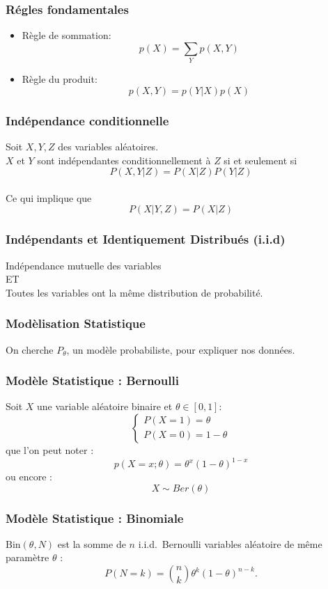 \begin{frame}
  \frametitle{Régles fondamentales}
  \begin{itemize}
  \item Règle de sommation: $$p(X)=\sum_{Y}p(X,Y)$$
  \item Règle du produit: $$p(X,Y)=p(Y|X)p(X)$$
  \end{itemize}
\end{frame}

\begin{frame}
  \frametitle{Indépendance conditionnelle}
    Soit $X,Y,Z$ des variables aléatoires. \\
    $X$ et $Y$ sont indépendantes conditionnellement à $Z$ si et seulement si $$P (X,Y | Z)=P(X|Z)P(Y|Z)$$ \\
    Ce qui implique que $$P(X|Y,Z)=P (X|Z)$$
\end{frame}

\begin{frame}
  \frametitle{Indépendants et Identiquement Distribués (i.i.d)}
  \begin{center}
  Indépendance mutuelle des variables\\
  ET\\
  Toutes les variables ont la même distribution de probabilité.
  \end{center}
\end{frame}

\begin{frame}
  \frametitle{Modèlisation Statistique}
  On cherche $P_{\theta}$, un modèle probabiliste, pour expliquer nos données.
\end{frame}

\begin{frame}
  \frametitle{Modèle Statistique : Bernoulli}
Soit $X$ une variable aléatoire binaire et $\theta \in [0,1]$:
\[
\left\{
    \begin{array}{ll}
        P(X=1)=\theta\\
        P(X=0)=1-\theta
    \end{array}
\right.
\]
que l'on peut noter : 
$$p(X=x;\theta) = \theta^x(1-\theta)^{1-x}$$
ou encore :
$$X \sim Ber(\theta)$$
\end{frame}

\begin{frame}
  \frametitle{Modèle Statistique : Binomiale}
  $\text{Bin}(\theta, N)$ est la somme de $n$ i.i.d.\ Bernoulli variables aléatoire de même paramètre $\theta$ :
  $$P(N=k)=\binom{n}{k} {\theta}^k (1-\theta)^{n-k}.$$
\end{frame}

